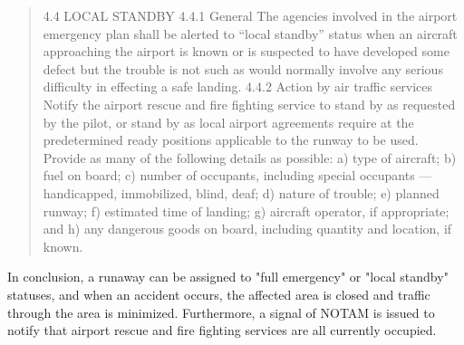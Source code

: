 \begin{quotation}
4.4 LOCAL STANDBY
4.4.1 General
The agencies involved in the airport emergency plan shall be alerted to “local standby” status when an aircraft
approaching the airport is known or is suspected to have developed some defect but the trouble is not such as would
normally involve any serious difficulty in effecting a safe landing.
4.4.2 Action by air traffic services
Notify the airport rescue and fire fighting service to stand by as requested by the pilot, or stand by as local airport
agreements require at the predetermined ready positions applicable to the runway to be used. Provide as many of the
following details as possible:
a) type of aircraft;
b) fuel on board;
c) number of occupants, including special occupants — handicapped, immobilized, blind, deaf;
d) nature of trouble;
e) planned runway;
f) estimated time of landing;
g) aircraft operator, if appropriate; and
h) any dangerous goods on board, including quantity and location, if known.
\end{quotation}


In conclusion, a runaway can be assigned to "full emergency" or "local standby" statuses, and when an accident occurs, the affected area is closed and traffic through the area is minimized. Furthermore, a signal of NOTAM is issued to notify that airport rescue and fire fighting services are all currently occupied.